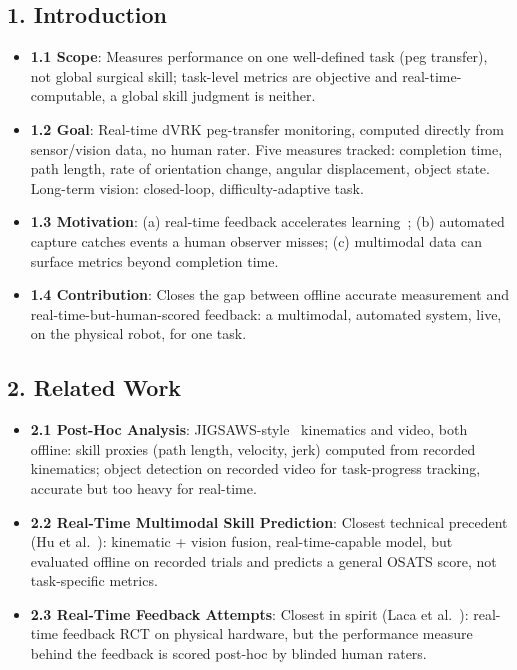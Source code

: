 \documentclass[11pt]{article}
\begin{document}
\subsection*{1. Introduction}
\begin{itemize}
  \item \textbf{1.1 Scope}: Measures performance on one well-defined
  task (peg transfer), not global surgical skill; task-level metrics
  are objective and real-time-computable, a global skill judgment is
  neither.
  \item \textbf{1.2 Goal}: Real-time dVRK peg-transfer monitoring,
  computed directly from sensor/vision data, no human rater. Five
  measures tracked: completion time, path length, rate of orientation
  change, angular displacement, object state. Long-term vision:
  closed-loop, difficulty-adaptive task.
  \item \textbf{1.3 Motivation}: (a) real-time feedback accelerates
  learning~\cite{laca2022}; (b) automated capture catches events a
  human observer misses; (c) multimodal data can surface metrics beyond
  completion time.
  \item \textbf{1.4 Contribution}: Closes the gap between offline
  accurate measurement and real-time-but-human-scored feedback: a
  multimodal, automated system, live, on the physical robot, for one
  task.
\end{itemize}

\subsection*{2. Related Work}
\begin{itemize}
  \item \textbf{2.1 Post-Hoc Analysis}: JIGSAWS-style~\cite{jigsaws}
  kinematics and video, both offline: skill proxies (path length,
  velocity, jerk) computed from recorded kinematics; object detection
  on recorded video for task-progress tracking, accurate but too heavy
  for real-time.
  \item \textbf{2.2 Real-Time Multimodal Skill Prediction}: Closest
  technical precedent (Hu et al.~\cite{hu2026}): kinematic + vision
  fusion, real-time-capable model, but evaluated offline on recorded
  trials and predicts a general OSATS score, not task-specific metrics.
  \item \textbf{2.3 Real-Time Feedback Attempts}: Closest in spirit
  (Laca et al.~\cite{laca2022}): real-time feedback RCT on physical
  hardware, but the performance measure behind the feedback is scored
  post-hoc by blinded human raters.
\end{itemize}
\end{document}
